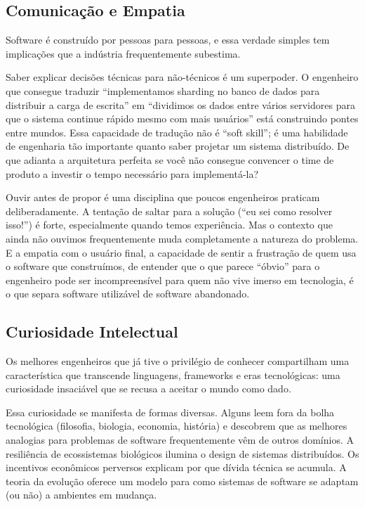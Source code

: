 \subsection{Comunicação e Empatia}

Software é construído por pessoas para pessoas, e essa verdade simples tem implicações que a indústria frequentemente subestima.

Saber explicar decisões técnicas para não-técnicos é um superpoder. O engenheiro que consegue traduzir ``implementamos sharding no banco de dados para distribuir a carga de escrita'' em ``dividimos os dados entre vários servidores para que o sistema continue rápido mesmo com mais usuários'' está construindo pontes entre mundos. Essa capacidade de tradução não é ``soft skill''; é uma habilidade de engenharia tão importante quanto saber projetar um sistema distribuído. De que adianta a arquitetura perfeita se você não consegue convencer o time de produto a investir o tempo necessário para implementá-la?

Ouvir antes de propor é uma disciplina que poucos engenheiros praticam deliberadamente. A tentação de saltar para a solução (``eu sei como resolver isso!'') é forte, especialmente quando temos experiência. Mas o contexto que ainda não ouvimos frequentemente muda completamente a natureza do problema. E a empatia com o usuário final, a capacidade de sentir a frustração de quem usa o software que construímos, de entender que o que parece ``óbvio'' para o engenheiro pode ser incompreensível para quem não vive imerso em tecnologia, é o que separa software utilizável de software abandonado.

\subsection{Curiosidade Intelectual}

Os melhores engenheiros que já tive o privilégio de conhecer compartilham uma característica que transcende linguagens, frameworks e eras tecnológicas: uma curiosidade insaciável que se recusa a aceitar o mundo como dado.

Essa curiosidade se manifesta de formas diversas. Alguns leem fora da bolha tecnológica (filosofia, biologia, economia, história) e descobrem que as melhores analogias para problemas de software frequentemente vêm de outros domínios. A resiliência de ecossistemas biológicos ilumina o design de sistemas distribuídos. Os incentivos econômicos perversos explicam por que dívida técnica se acumula. A teoria da evolução oferece um modelo para como sistemas de software se adaptam (ou não) a ambientes em mudança.


